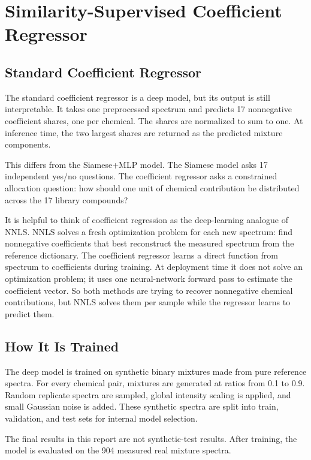 \documentclass[11pt]{article}
\begin{document}
\section*{Similarity-Supervised Coefficient Regressor}

\subsection*{Standard Coefficient Regressor}

The standard coefficient regressor is a deep model, but its output is still interpretable. It takes one preprocessed spectrum and predicts 17 nonnegative coefficient shares, one per chemical. The shares are normalized to sum to one. At inference time, the two largest shares are returned as the predicted mixture components.

This differs from the Siamese+MLP model. The Siamese model asks 17 independent yes/no questions. The coefficient regressor asks a constrained allocation question: how should one unit of chemical contribution be distributed across the 17 library compounds?

It is helpful to think of coefficient regression as the deep-learning analogue of NNLS. NNLS solves a fresh optimization problem for each new spectrum: find nonnegative coefficients that best reconstruct the measured spectrum from the reference dictionary. The coefficient regressor learns a direct function from spectrum to coefficients during training. At deployment time it does not solve an optimization problem; it uses one neural-network forward pass to estimate the coefficient vector. So both methods are trying to recover nonnegative chemical contributions, but NNLS solves them per sample while the regressor learns to predict them.

\subsection*{How It Is Trained}

The deep model is trained on synthetic binary mixtures made from pure reference spectra. For every chemical pair, mixtures are generated at ratios from 0.1 to 0.9. Random replicate spectra are sampled, global intensity scaling is applied, and small Gaussian noise is added. These synthetic spectra are split into train, validation, and test sets for internal model selection.

The final results in this report are not synthetic-test results. After training, the model is evaluated on the 904 measured real mixture spectra.
\end{document}
